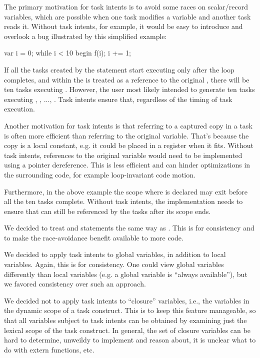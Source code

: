 \begin{rationale}
The primary motivation for task intents is to avoid some races on
scalar/record variables, which are possible when one task modifies a
variable and another task reads it. Without task intents,
for example, it would be easy to introduce and overlook a bug
illustrated by this simplified example:

  \begin{chapel}
  {
    var i = 0;
    while i < 10 {
      begin {
        f(i);
      }
      i += 1;
    }
  }
  \end{chapel}

If all the tasks created by the  statement start executing
only after the  loop completes, and  within the
 is treated as a reference to the original ,
there will be ten tasks executing . However, the user most
likely intended to generate ten tasks executing
, , ..., .
Task intents ensure that, regardless of the timing of task execution.

Another motivation for task intents is that referring to a captured
copy in a task is often more efficient than referring to the original
variable. That's because the copy is a local constant, e.g. it could
be placed in a register when it fits.  Without task intents,
references to the original variable would need to be implemented using
a pointer dereference. This is less efficient and can hinder optimizations
in the surrounding code, for example loop-invariant code motion.

Furthermore, in the above example the scope where  is declared
may exit before all the ten tasks complete.  Without task intents,
the implementation needs to ensure that  can still be
referenced by the tasks after its scope ends.

We decided to treat  and  statements the
same way as . This is for consistency and to make the
race-avoidance benefit available to more code.

We decided to apply task intents to global variables, in addition to local
variables. Again, this is for consistency. One could view global
variables differently than local variables (e.g. a global variable is
``always available''), but we favored consistency over such an approach.

We decided not to apply task intents to ``closure'' variables, i.e.,
the variables in the dynamic scope of a task construct. This is to
keep this feature manageable, so that all variables subject to task
intents can be obtained by examining just the lexical scope of the
task construct. In general, the set of closure variables can be hard
to determine, unweildy to implement and reason about, it is unclear
what to do with extern functions, etc.
\end{rationale}


